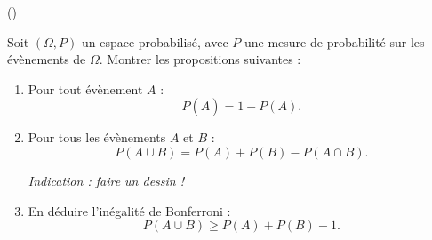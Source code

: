 \begin{exercice}\label{exo3-3} (\minsyndical)

Soit $(\Omega, P)$ un espace probabilis\'e, avec $P$ une mesure
de probabilit\'e sur les \'ev\`enements de $\Omega$. Montrer les propositions suivantes :

\begin{enumerate}

\item Pour tout \'ev\`enement $A$ :
\[
P(\bar{A}) = 1 - P(A).
\]

\item Pour tous les \'ev\`enements $A$ et $B$ :
\[
P(A \cup B) = P(A) + P(B) - P(A \cap B).
\]

{\it Indication : faire un dessin !}

\item En d\'eduire l'in\'egalit\'e de Bonferroni :
\[
P(A \cup B) \geq P(A) + P(B) - 1.
\]

\end{enumerate}

\end{exercice}
